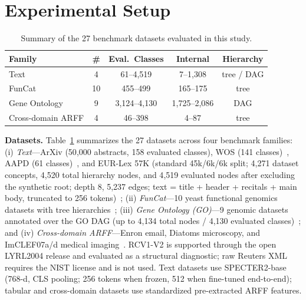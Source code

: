 \documentclass[conference]{IEEEtran}
\begin{document}
\section{Experimental Setup}
\label{sec:setup}

\begin{table}[t]
\caption{Summary of the 27 benchmark datasets evaluated in this study.}
\label{tab:datasets}
\centering
\footnotesize
\setlength{\tabcolsep}{3.5pt}
\begin{tabular}{lcccc}
\toprule
Family & \# & Eval.\ Classes & Internal & Hierarchy \\
\midrule
Text & 4 & 61--4{,}519 & 7--1{,}308 & tree / DAG \\
FunCat & 10 & 455--499 & 165--175 & tree \\
Gene Ontology & 9 & 3{,}124--4{,}130 & 1{,}725--2{,}086 & DAG \\
Cross-domain ARFF & 4 & 46--398 & 4--87 & tree \\
\bottomrule
\end{tabular}
\end{table}

\textbf{Datasets.} Table~\ref{tab:datasets} summarizes the 27 datasets across
four benchmark families: (i) \emph{Text}---ArXiv (50{,}000 abstracts, 158 evaluated classes), WOS
(141 classes)~\cite{hpt}, AAPD (61 classes)~\cite{aapd}, and EUR-Lex 57K
(standard 45k/6k/6k split; 4{,}271 dataset concepts, 4{,}520 total hierarchy
nodes, and 4{,}519 evaluated nodes after excluding the synthetic root; depth 8,
5{,}237 edges; text = title + header + recitals + main body, truncated to 256
tokens)~\cite{eurlex57k}; (ii) \emph{FunCat}---10 yeast functional genomics
datasets with tree hierarchies~\cite{clus}; (iii) \emph{Gene Ontology (GO)}---9
genomic datasets annotated over the GO DAG (up to 4{,}134 total nodes / 4{,}130
evaluated classes)~\cite{clus,cerri2014hmc}; and (iv) \emph{Cross-domain
ARFF}---Enron email, Diatoms microscopy, and ImCLEF07a/d medical
imaging~\cite{clus}. RCV1-V2 is supported through the open LYRL2004 release and
evaluated as a structural diagnostic; raw Reuters XML requires the NIST license
and is not used. Text datasets use SPECTER2-base~\cite{specter2} (768-d, CLS
pooling; 256 tokens when frozen, 512 when fine-tuned end-to-end); tabular and
cross-domain datasets use standardized pre-extracted ARFF features.
\end{document}
